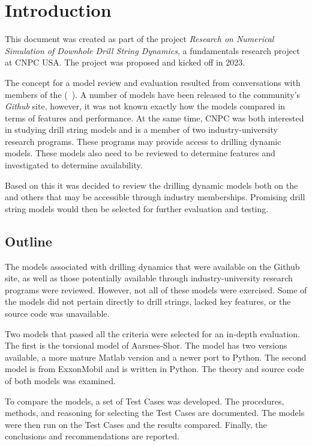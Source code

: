 \chapter{Introduction}
This document was created as part of the project \emph{Research on Numerical Simulation of Downhole Drill String Dynamics}, a fundamentals research project at CNPC USA.  The project was proposed and kicked off in 2023.

The concept for a model review and evaluation resulted from conversations with members of the \osdc{} (~\cite{ref:pastusek2019a}).  A number of models have been released to the community's \emph{Github} site, however, it was not known exactly how the models compared in terms of features and performance.  At the same time, CNPC was both interested in studying drill string models and is a member of two industry-university research programs.  These programs may provide access to drilling dynamic models.  These models also need to be reviewed to determine features and investigated to determine availability.

Based on this it was decided to review the drilling dynamic models both on the \osdc{} and others that may be accessible through industry memberships.  Promising drill string models would then be selected for further evaluation and testing.

\section{Outline}
The models associated with drilling dynamics that were available on the \osdc{} Github site, as well as those potentially available through industry-university research programs were reviewed.  However, not all of these models were exercised.  Some of the models did not pertain directly to drill strings, lacked key features, or the source code was unavailable.

Two models that passed all the criteria were selected for an in-depth evaluation.  The first is the torsional model of Aarsnes-Shor.  The model has two versions available, a more mature Matlab version and a newer port to Python.  The second model is from ExxonMobil and is written in Python.  The theory and source code of both models was examined.

To compare the models, a set of Test Cases was developed.  The procedures, methods, and reasoning for selecting the Test Cases are documented.  The models were then run on the Test Cases and the results compared.  Finally, the conclusions and recommendations are reported.

